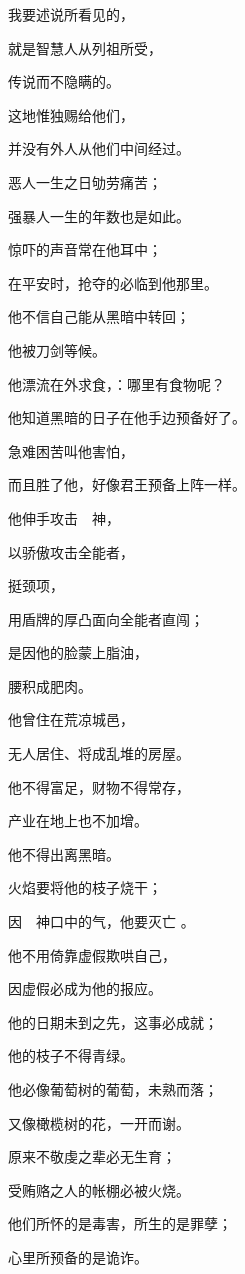 {\par }{\Q 我要述说所看见的，
\par }{\Q {}就是智慧人从列祖所受，
\par }{\Q 传说而不隐瞒的。
\par }{\Q {}这地惟独赐给他们，
\par }{\Q 并没有外人从他们中间经过。
\par }{\Q {}恶人一生之日劬劳痛苦；
\par }{\Q 强暴人一生的年数也是如此。
\par }{\Q {}惊吓的声音常在他耳中；
\par }{\Q 在平安时，抢夺的必临到他那里。
\par }{\Q {}他不信自己能从黑暗中转回；
\par }{\Q 他被刀剑等候。
\par }{\Q {}他漂流在外求食，{}：哪里有食物呢？
\par }{\Q 他知道黑暗的日子在他手边预备好了。
\par }{\Q {}急难困苦叫他害怕，
\par }{\Q 而且胜了他，好像君王预备上阵一样。
\par }{\Q {}他伸手攻击　神，
\par }{\Q 以骄傲攻击全能者，
\par }{\Q {}挺{}颈项，
\par }{\Q 用盾牌的厚凸面向全能者直闯；
\par }{\Q {}是因他的脸蒙上脂油，
\par }{\Q 腰积成肥肉。
\par }{\Q {}他曾住在荒凉城邑，
\par }{\Q 无人居住、将成乱堆的房屋。
\par }{\Q {}他不得富足，财物不得常存，
\par }{\Q 产业在地上也不加增。
\par }{\Q {}他不得出离黑暗。
\par }{\Q 火焰要将他的枝子烧干；
\par }{\Q 因　神口中的气，他要灭亡
。
\par }{\Q {}他不用倚靠虚假欺哄自己，
\par }{\Q 因虚假必成为他的报应。
\par }{\Q {}他的日期未到之先，这事必成就；
\par }{\Q 他的枝子不得青绿。
\par }{\Q {}他必像葡萄树的葡萄，未熟而落；
\par }{\Q 又像橄榄树的花，一开而谢。
\par }{\Q {}原来不敬虔之辈必无生育；
\par }{\Q 受贿赂之人的帐棚必被火烧。
\par }{\Q {}他们所怀的是毒害，所生的是罪孽；
\par }{\Q 心里所预备的是诡诈。

}
